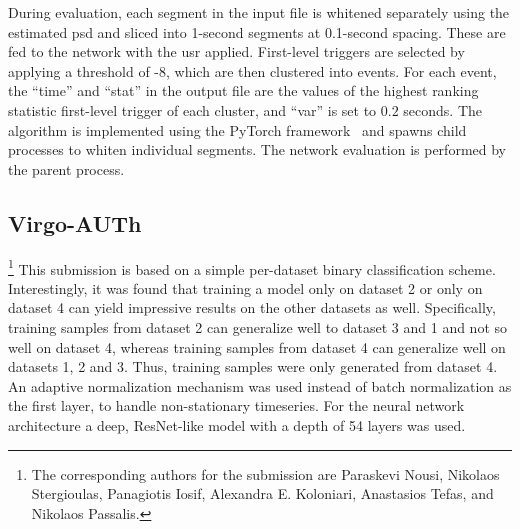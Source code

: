 During evaluation, each segment in the input file is whitened separately using the estimated \acrshort{psd} and sliced into 1-second segments at 0.1-second spacing. These are fed to the network with the \acrshort{usr} applied. First-level triggers are selected by applying a threshold of -8, which are then clustered into events. For each event, the ``time'' and ``stat'' in the output file are the values of the highest ranking statistic first-level trigger of each cluster, and ``var'' is set to $0.2$ seconds. The algorithm is implemented using the PyTorch framework~\cite{Paszke:2019aaa} and spawns child processes to whiten individual segments. The network evaluation is performed by the parent process.


\subsection{Virgo-AUTh}\label{sec:submission-auth}
\footnote{The corresponding authors for the \virgo submission are Paraskevi Nousi, Nikolaos Stergioulas, Panagiotis Iosif, Alexandra E. Koloniari, Anastasios Tefas, and Nikolaos Passalis.}
This submission is based on a simple per-dataset binary classification scheme. Interestingly, it was found that training a model only on dataset 2 or only on dataset 4 can yield impressive results on the other datasets as well. Specifically, training samples from dataset 2 can generalize well to dataset 3 and 1 and not so well on dataset 4, whereas training samples from dataset 4 can generalize well on datasets 1, 2 and 3. Thus, training samples were only generated from dataset 4. An adaptive normalization mechanism \cite{passalis2019deep} was used instead of batch normalization as the first layer, to handle non-stationary timeseries. For the neural network architecture a deep, ResNet-like model \cite{He:2015aaa} with a depth of 54 layers was used.

